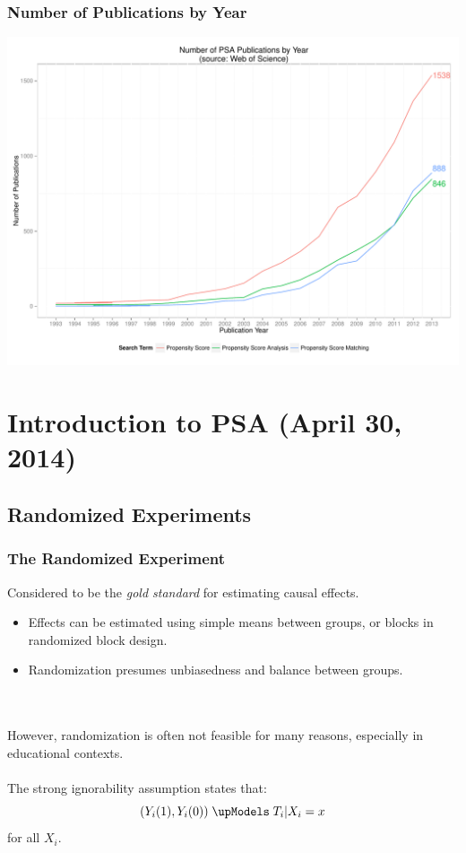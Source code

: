 \documentclass[10pt,slidestop,mathserif,c]{beamer}
\begin{document}
\begin{frame}
    \frametitle{Number of Publications by Year}
    \begin{center}
        \includegraphics{figures/Slides-popularity}
    \end{center}
    

\end{frame}


\section{Introduction to PSA (April 30, 2014)}

\subsection{Randomized Experiments}

\begin{frame}
    \frametitle{The Randomized Experiment}
    
    Considered to be the \textit{gold standard} for estimating causal effects.
    
    \begin{itemize}
        \item Effects can be estimated using simple means between groups, or blocks in randomized block design.
        \item Randomization presumes unbiasedness and balance between groups.
    \end{itemize}
    \ \\ \ \\
    However, randomization is often not feasible for many reasons, especially in educational contexts.
    \pause
    \ \\ \ \\
    The strong ignorability assumption states that:
    $$({ Y }_{ i }(1),{ Y }_{ i }(0)) \; \upModels \; { T }_{ i }|{ X }_{ i }=x$$
    for all ${X}_{i}$.
    
\end{frame}
\end{document}
